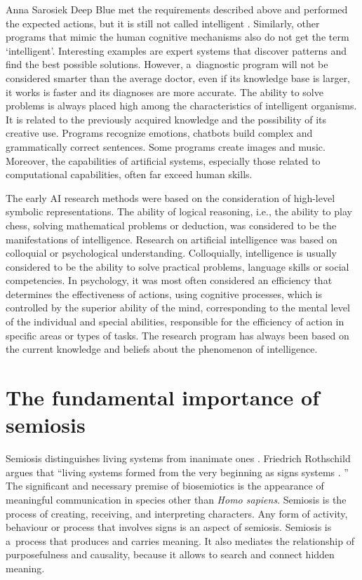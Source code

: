 \begin{artengenv}{Anna Sarosiek}
Deep Blue met the requirements described above and performed the expected actions, but it is still not called intelligent
\parencite[][]{noauthor_deep_2012}. %
 Similarly, other programs that mimic the human cognitive mechanisms also do not get the term ‘intelligent’. Interesting examples are expert systems that discover patterns and find the best possible solutions. However, a~diagnostic program will not be considered smarter than the average doctor, even if its knowledge base is larger, it works is faster and its diagnoses are more accurate. The ability to solve problems is always placed high among the characteristics of intelligent organisms. It is related to the previously acquired knowledge and the possibility of its creative use. Programs recognize emotions, chatbots build complex and grammatically correct sentences. Some programs create images and music. Moreover, the capabilities of artificial systems, especially those related to computational capabilities, often far exceed human skills.

The early AI research methods were based on the consideration of high-level symbolic representations. The ability of logical reasoning, i.e., 
the ability to play chess,
solving mathematical problems or deduction, was considered to be  the manifestations of intelligence. Research on artificial intelligence was based on colloquial or psychological understanding. Colloquially, intelligence is usually considered to be the ability to solve practical problems, language skills or social competencies. In psychology, it was most often considered an efficiency that determines the effectiveness of actions, using cognitive processes, which is controlled by the superior ability of the mind, corresponding to the mental level of the individual and special abilities, responsible for the efficiency of action in specific areas or types of tasks. The research program has always been based on the current knowledge and beliefs about the phenomenon of intelligence.

\section*{The fundamental importance of semiosis}
Semiosis distinguishes living systems from inanimate ones
\parencite[][]{sebeok_communication_1988}. %
 Friedrich Rothschild argues that ``living systems formed from the very beginning as signs systems 
\parencite[][]{rothschild_laws_1962}.%
'' The significant and necessary premise of biosemiotics is the appearance of meaningful communication in species other than \textit{Homo sapiens}. Semiosis is the process of creating, receiving, and interpreting characters. Any form of activity, behaviour or process that involves signs is an aspect of semiosis. Semiosis is a~process that produces and carries meaning. It also mediates the relationship of purposefulness and causality, because it allows to search and connect hidden meaning.


\end{artengenv}
